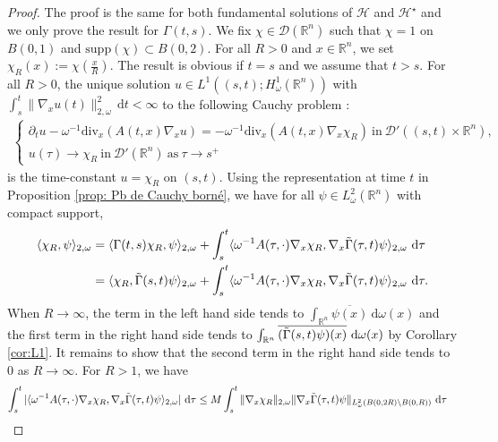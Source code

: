 \documentclass[12pt, letterpaper]{amsart}
\theoremstyle{definition}
\theoremstyle{remark}
\numberwithin{equation}{section}
\begin{document}
\begin{proof}
The proof is the same for both fundamental solutions of $\mathcal{H}$ and $\mathcal{H}^\star$ and we only prove the result for $\Gamma(t,s)$. We fix $\chi \in \mathcal{D}(\mathbb{R}^n)$ such that $\chi=1$ on $B(0,1)$ and $\mathrm{supp}(\chi)\subset B(0,2)$. For all $R>0$ and $x \in \mathbb{R}^n$, we set $\chi_{R}(x):= \chi(\frac{x}{R})$. The result is obvious if $t=s$ and we assume that $t>s$. For all $R>0$, the unique solution $u \in L^1((s,t);H^1_\omega(\mathbb{R}^n))$ with $\int_s^t\|\nabla_x u(t)\|^2_{2,\omega}\, \mathrm{d}t<\infty$ to the  following Cauchy problem : 
\begin{align*}
\left\{
    \begin{array}{ll}
        \partial_t u -\omega^{-1} \mathrm{div}_x(A(t,x)\nabla_x u)  = - \omega^{-1} \mathrm{div}_x(A(t,x) \nabla_x \chi_{R}) \ \mathrm{in} \  \mathcal{D}'((s,t)\times \mathbb{R}^n), \\
        u(\tau) \rightarrow \chi_{R} \  \mathrm{ in } \ \mathcal{D'}(\mathbb{R}^n) \ \mathrm{as} \ \tau \rightarrow s^+
    \end{array}
\right.
\end{align*} 
is the time-constant $u=\chi_{R}$ on $(s,t)$. Using the representation at time $t$ in Proposition \ref{prop: Pb de Cauchy borné}, we have for all $\psi \in L^2_\omega(\mathbb{R}^n)$ with compact support, 
\begin{align*}
    \langle \chi_{R}, \psi \rangle_{2,\omega} &= \langle \Gamma(t,s)\chi_{R}, \psi \rangle_{2,\omega}+ \int_{s}^{t} \langle \omega ^{-1} A(\tau,\cdot) \nabla_x \chi_{R}, \nabla_x \Tilde{\Gamma}(\tau,t)\psi \rangle_{2,\omega}\  \mathrm d \tau\\
    &= \langle \chi_{R}, \Tilde{\Gamma}(s,t)\psi \rangle_{2,\omega}+ \int_{s}^{t} \langle \omega ^{-1} A(\tau,\cdot) \nabla_x \chi_{R}, \nabla_x \Tilde{\Gamma}(\tau,t)\psi \rangle_{2,\omega}\  \mathrm d \tau.
\end{align*}
When $R \to \infty$, the term in the left hand side tends to $\int_{\mathbb{R}^n}\overline{\psi(x)} \ \mathrm{d}\omega(x)$ and the first term in the right hand side tends to $\int_{\mathbb{R}^n}\overline{(\Tilde{\Gamma}(s,t)\psi)(x)} \ \mathrm{d}\omega(x)$ by Corollary \ref{cor:L1}. It remains to show that the second term in the right hand side tends to $0$ as $R \to \infty$. For $R>1$, we have
\begin{align*}
    \int_{s}^{t} |\langle \omega ^{-1} A(\tau,\cdot) \nabla_x \chi_{R}, \nabla_x \Tilde{\Gamma}(\tau,t)\psi \rangle_{2,\omega} | \  \mathrm d \tau &\leq M \int_{s}^{t} \|  \nabla_x \chi_{R} \|_{2,\omega} \| \nabla_x \Tilde{\Gamma}(\tau,t)\psi \|_{L^2_\omega(B(0,2R)\setminus B(0,R))} \  \mathrm d \tau

\end{align*}
\end{proof}
\end{document}
